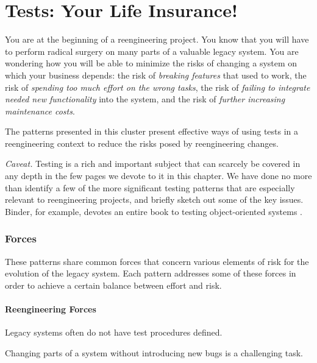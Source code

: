 \documentclass[a4paper,10pt,twoside]{book}
\begin{document}
	\renewcommand{\nnbb}[2]{} %
	\sloppy
\fi
\chapter{Tests: Your Life Insurance!}

You are at the beginning of a reengineering project. You know that you will have to perform radical surgery on many parts of a valuable legacy system. You are wondering how you will be able to minimize the risks of changing a system on which your business depends: the risk of \emph{breaking features} that used to work, the risk of \emph{spending too much effort on the wrong tasks}, the risk of \emph{failing to integrate needed new functionality} into the system, and the risk of \emph{further increasing maintenance costs}.

The patterns presented in this cluster present effective ways of using tests in a reengineering context to reduce the risks posed by reengineering changes.

\noindent
\emph{Caveat.}
Testing is a rich and important subject that can scarcely be covered in any depth in the few pages we devote to it in this chapter. We have done no more than identify a few of the more significant testing patterns that are especially relevant to reengineering projects, and briefly sketch out some of the key issues. Binder, for example, devotes an entire book to testing object-oriented systems \cite{Bind99a}.

\subsection*{Forces}

These patterns share common forces that concern various elements of risk for the evolution of the legacy system. Each pattern addresses some of these forces in order to achieve a certain balance between effort and risk.

\subsubsection*{Reengineering Forces}

\begin{bulletlist}
\item Legacy systems often do not have test procedures defined.

\item Changing parts of a system without introducing new bugs is a challenging task.
\end{bulletlist}
\end{document}
